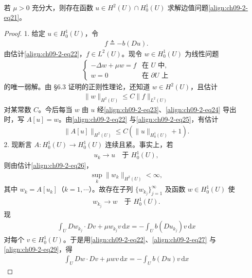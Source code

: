 \documentclass[../../main.tex]{subfiles}
\begin{document}
\begin{example}
\begin{theorem}[存在性]\label{theorem:ch09-2-5-半线性椭圆存在}
若 $\mu>0$ 充分大，则存在函数 $u\in H^2(U)\cap H_0^1(U)$ 求解边值问题\eqref{align:ch09-2-eq21}。
\begin{proof}
1. 给定 $u\in H_0^1(U)$，令
\begin{align}
f\triangleq-b(Du).\label{align:ch09-2-eq23}
\end{align}
由估计\eqref{align:ch09-2-eq22}，$f\in L^2(U)$。现令 $w\in H_0^1(U)$ 为线性问题
\begin{align}
\begin{cases}
-\Delta w+\mu w=f&\text{在 }U\text{ 中},\\
w=0&\text{在 }\partial U\text{ 上}
\end{cases}\label{align:ch09-2-eq24}
\end{align}
的唯一弱解。由 \S6.3 证明的正则性理论，还知道 $w\in H^2(U)$，且估计
\begin{align}
\|w\|_{H^2(U)}\leqslant C\|f\|_{L^2(U)}\label{align:ch09-2-eq25}
\end{align}
对某常数 $C$。今后每当 $w$ 由 $u$ 经\eqref{align:ch09-2-eq23}、\eqref{align:ch09-2-eq24} 导出时，写 $A[u]=w$。由\eqref{align:ch09-2-eq22} 与\eqref{align:ch09-2-eq25}，有估计
\begin{align}
\|A[u]\|_{H^2(U)}\leqslant C(\|u\|_{H_0^1(U)}+1).\label{align:ch09-2-eq26}
\end{align}
2. 现断言 $A:H_0^1(U)\to H_0^1(U)$ 连续且紧。事实上，若
\begin{align}
u_k\to u\quad\text{于 }H_0^1(U),\label{align:ch09-2-eq27}
\end{align}
则由估计\eqref{align:ch09-2-eq26}，
\begin{align}
\sup_k\|w_k\|_{H^2(U)}<\infty,\label{align:ch09-2-eq28}
\end{align}
其中 $w_k=A[u_k]$（$k=1,\cdots$）。故存在子列 $\{w_{k_j}\}_{j=1}^\infty$ 及函数 $w\in H_0^1(U)$ 使
\begin{align}
w_{k_j}\to w\quad\text{于 }H_0^1(U).\label{align:ch09-2-eq29}
\end{align}
现
\begin{align*}
\int_U Dw_{k_j}\cdot Dv+\mu w_{k_j}v\,\mathrm{d}x=-\int_U b(Du_{k_j})v\,\mathrm{d}x
\end{align*}
对每个 $v\in H_0^1(U)$。于是用\eqref{align:ch09-2-eq22}、\eqref{align:ch09-2-eq27} 与\eqref{align:ch09-2-eq29}，得
\begin{align*}
\int_U Dw\cdot Dv+\mu wv\,\mathrm{d}x=-\int_U b(Du)v\,\mathrm{d}x
\end{align*}

\end{proof}
\end{theorem}
\end{example}
\end{document}
